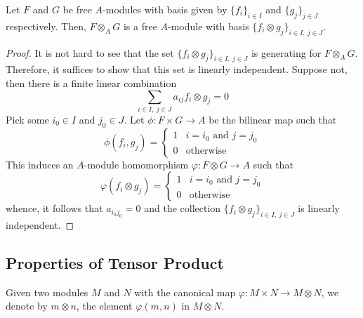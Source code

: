 \begin{proposition}
    Let $F$ and $G$ be free $A$-modules with basis given by $\{f_i\}_{i\in I}$ and $\{g_j\}_{j\in J}$ respectively. Then, $F\otimes_A G$ is a free $A$-module with basis $\{f_i\otimes g_j\}_{i\in I,~j\in J}$.
\end{proposition}
\begin{proof}
    It is not hard to see that the set $\{f_i\otimes g_j\}_{i\in I,~j\in J}$ is generating for $F\otimes_A G$. Therefore, it suffices to show that this set is linearly independent. Suppose not, then there is a finite linear combination 
    \begin{equation*}
        \sum_{i\in I,~j\in J}a_{ij}f_i\otimes g_j = 0
    \end{equation*}
    Pick some $i_0\in I$ and $j_0\in J$. Let $\phi: F\times G\to A$ be the bilinear map such that 
    \begin{equation*}
        \phi(f_i,g_j) = 
        \begin{cases}
            1 & i = i_0\text{ and } j = j_0\\
            0 & \text{otherwise}
        \end{cases}
    \end{equation*}
    This induces an $A$-module homomorphism $\varphi: F\otimes G\to A$ such that 
    \begin{equation*}
        \varphi(f_i\otimes g_j) = 
        \begin{cases}
            1 & i = i_0\text{ and } j = j_0\\
            0 & \text{otherwise}
        \end{cases}
    \end{equation*}
    whence, it follows that $a_{i_0j_0} = 0$ and the collection $\{f_i\otimes g_j\}_{i\in I,~j\in J}$ is linearly independent.
\end{proof}

\subsection{Properties of Tensor Product}

Given two modules $M$ and $N$ with the canonical map $\varphi: M\times N\to M\otimes N$, we denote by $m\otimes n$, the element $\varphi(m,n)$ in $M\otimes N$.

